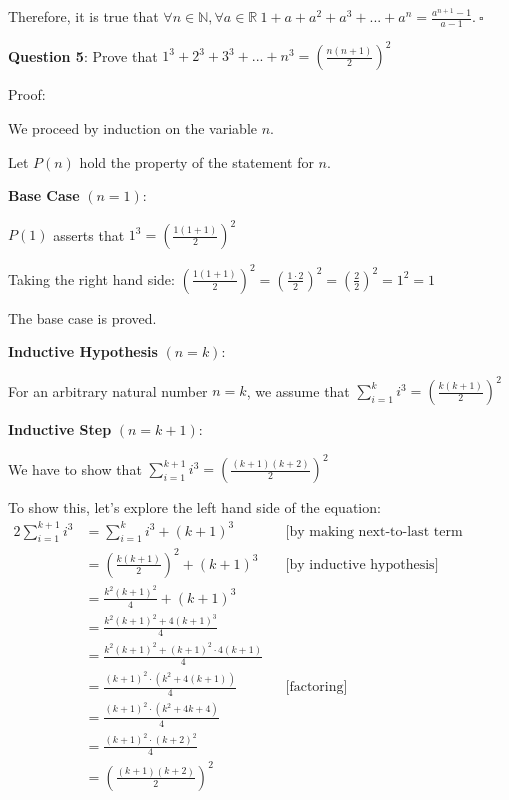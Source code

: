 \documentclass{article} %
\newcommand{\question}[2][]{\begin{flushleft}
        \textbf{Question #1}: #2

\end{flushleft}}
\begin{document}
    Therefore, it is true that $\forall n \in \mathbb{N}, \forall a \in \mathbb{R}\ 1 + a + a^2 + a^3 + ... + a^n = \frac{a^{n + 1} - 1}{a - 1}.\ \square$

    \newpage

    \question[5]{Prove that $1^3 + 2^3 + 3^3 + ... + n^3 = (\frac{n(n+1)}{2})^2$}

    Proof:

    We proceed by induction on the variable $n$.

    Let $P(n)$ hold the property of the statement for $n$.

    \textbf{Base Case} $(n = 1)$:

    $P(1)$ asserts that $1^3 = (\frac{1(1+1)}{2})^2$

    Taking the right hand side: $(\frac{1(1+1)}{2})^2  = (\frac{1 \cdot 2}{2})^2 = (\frac{2}{2})^2 = 1^2 = 1$

    The base case is proved.

    \textbf{Inductive Hypothesis} $(n = k)$:

    For an arbitrary natural number $n = k$, we assume that $\sum_{i = 1}^k i^3 = (\frac{k(k+1)}{2})^2$

    \textbf{Inductive Step} $(n = k + 1)$:

    We have to show that $\sum_{i = 1}^{k + 1} i^3 = (\frac{(k + 1)(k + 2)}{2})^2$

    To show this, let's explore the left hand side of the equation:
    \begin{alignat*}{2}
        \sum_{i = 1}^{k + 1} i^3 &= \sum_{i = 1}^{k} i^3 + (k + 1)^3 &&\text{[by making next-to-last term explicit]}\\
        &= \left(\frac{k(k+1)}{2}\right)^2 + (k + 1)^3 &&\text{[by inductive hypothesis]}\\
        &= \frac{k^2(k+1)^2}{4} + (k + 1)^3\\
        &= \frac{k^2(k+1)^2+ 4(k + 1)^3}{4}\\
        &= \frac{k^2(k+1)^2+ (k + 1)^2 \cdot 4(k + 1)}{4}\\
        &= \frac{(k + 1)^2 \cdot (k^2 + 4(k + 1))}{4} &&\text{[factoring]}\\
        &= \frac{(k + 1)^2 \cdot (k^2 + 4k + 4)}{4}\\
        &= \frac{(k + 1)^2 \cdot (k + 2)^2}{4}\\
        &= \left(\frac{(k + 1)(k+2)}{2}\right) ^2\\
    \end{alignat*}
\end{document}
